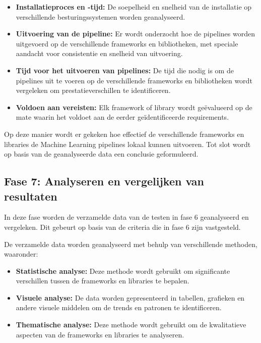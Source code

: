 \begin{itemize}
  \item \textbf{Installatieproces en -tijd:} De soepelheid en snelheid van de installatie op verschillende besturingssystemen worden geanalyseerd.
  \item \textbf{Uitvoering van de pipeline:} Er wordt onderzocht hoe de pipelines worden uitgevoerd op de verschillende frameworks en bibliotheken, met speciale aandacht voor consistentie en snelheid van uitvoering.
  \item \textbf{Tijd voor het uitvoeren van pipelines:} De tijd die nodig is om de pipelines uit te voeren op de verschillende frameworks en bibliotheken wordt vergeleken om prestatieverschillen te identificeren.
  \item \textbf{Voldoen aan vereisten:} Elk framework of library wordt geëvalueerd op de mate waarin het voldoet aan de eerder geïdentificeerde requirements.
\end{itemize}
Op deze manier wordt er gekeken hoe effectief de verschillende frameworks en libraries de Machine Learning pipelines lokaal kunnen uitvoeren. Tot slot wordt op basis van de geanalyseerde data een conclusie geformuleerd.\\
\subsection{Fase 7: Analyseren en vergelijken van resultaten}
In deze fase worden de verzamelde data van de testen in fase 6 geanalyseerd en vergeleken. Dit gebeurt op basis van de criteria die in fase 6 zijn vastgesteld.

De verzamelde data worden geanalyseerd met behulp van verschillende methoden, waaronder:
\begin{itemize}
  \item \textbf{Statistische analyse:} Deze methode wordt gebruikt om significante verschillen tussen de frameworks en libraries te bepalen.
  \item \textbf{Visuele analyse:} De data worden gepresenteerd in tabellen, grafieken en andere visuele middelen om de trends en patronen te identificeren.
  \item \textbf{Thematische analyse:}  Deze methode wordt gebruikt om de kwalitatieve aspecten van de frameworks en libraries te analyseren.
\end{itemize}

